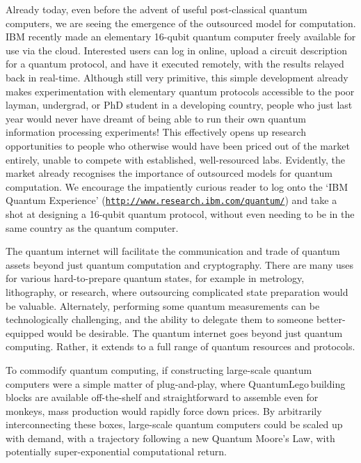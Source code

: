 Already today, even before the advent of useful post-classical quantum computers, we are seeing the emergence of the outsourced model for computation. IBM recently made an elementary 16-qubit quantum computer freely available for use via the cloud. Interested users can log in online, upload a circuit description for a quantum protocol, and have it executed remotely, with the results relayed back in real-time. Although still very primitive, this simple development already makes experimentation with elementary quantum protocols accessible to the poor layman, undergrad, or PhD student in a developing country, people who just last year would never have dreamt of being able to run their own quantum information processing experiments! This effectively opens up research opportunities to people who otherwise would have been priced out of the market entirely, unable to compete with established, well-resourced labs. Evidently, the market already recognises the importance of outsourced models for quantum computation. We encourage the impatiently curious reader to log onto the `IBM Quantum Experience' (\texttt{\href{http://www.research.ibm.com/quantum/}{http://www.research.ibm.com/quantum/}}) and take a shot at designing a 16-qubit quantum protocol, without even needing to be in the same country as the quantum computer.

The quantum internet will facilitate the communication and trade of quantum assets beyond just quantum computation and cryptography. There are many uses for various hard-to-prepare quantum states, for example in metrology, lithography, or research, where outsourcing complicated state preparation would be valuable. Alternately, performing some quantum measurements can be technologically challenging, and the ability to delegate them to someone better-equipped would be desirable. The quantum internet goes beyond just quantum computing. Rather, it extends to a full range of quantum resources and protocols. 

To commodify quantum computing, if constructing large-scale quantum computers were a simple matter of plug-and-play, where QuantumLego\texttrademark\,building blocks are available off-the-shelf and straightforward to assemble even for monkeys, mass production would rapidly force down prices. By arbitrarily interconnecting these boxes, large-scale quantum computers could be scaled up with demand, with a trajectory following a new Quantum Moore's Law, with potentially super-exponential computational return.

